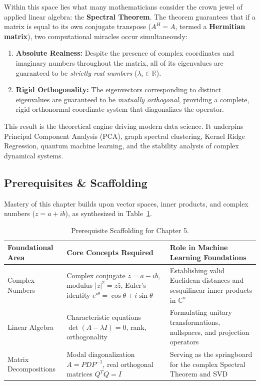 Within this space lies what many mathematicians consider the crown jewel of applied linear algebra: the \textbf{Spectral Theorem}. The theorem guarantees that if a matrix is equal to its own conjugate transpose ($A^H = A$, termed a \textbf{Hermitian matrix}), two computational miracles occur simultaneously:
\begin{enumerate}
    \item \textbf{Absolute Realness:} Despite the presence of complex coordinates and imaginary numbers throughout the matrix, all of its eigenvalues are guaranteed to be \emph{strictly real numbers} ($\lambda_i \in \mathbb{R}$).
    \item \textbf{Rigid Orthogonality:} The eigenvectors corresponding to distinct eigenvalues are guaranteed to be \emph{mutually orthogonal}, providing a complete, rigid orthonormal coordinate system that diagonalizes the operator.
\end{enumerate}

This result is the theoretical engine driving modern data science. It underpins Principal Component Analysis (PCA), graph spectral clustering, Kernel Ridge Regression, quantum machine learning, and the stability analysis of complex dynamical systems.

\subsection{Prerequisites \& Scaffolding}
Mastery of this chapter builds upon vector spaces, inner products, and complex numbers ($z = a + ib$), as synthesized in Table~\ref{tab:w05_prereqs}.

\begin{table}[htbp]
\centering
\small
\begin{tabularx}{\textwidth}{lXX}
\toprule
\textbf{Foundational Area} & \textbf{Core Concepts Required} & \textbf{Role in Machine Learning Foundations} \\
\midrule
Complex Numbers & Complex conjugate $\bar{z} = a - ib$, modulus $|z|^2 = z\bar{z}$, Euler's identity $e^{i\theta} = \cos\theta + i\sin\theta$ & Establishing valid Euclidean distances and sesquilinear inner products in $\mathbb{C}^n$ \\
\addlinespace
Linear Algebra & Characteristic equations $\det(A - \lambda I) = 0$, rank, orthogonality & Formulating unitary transformations, nullspaces, and projection operators \\
\addlinespace
Matrix Decompositions & Modal diagonalization $A = PDP^{-1}$, real orthogonal matrices $Q^T Q = I$ & Serving as the springboard for the complex Spectral Theorem and SVD \\
\bottomrule
\end{tabularx}
\caption{Prerequisite Scaffolding for Chapter 5.}
\label{tab:w05_prereqs}
\end{table}


